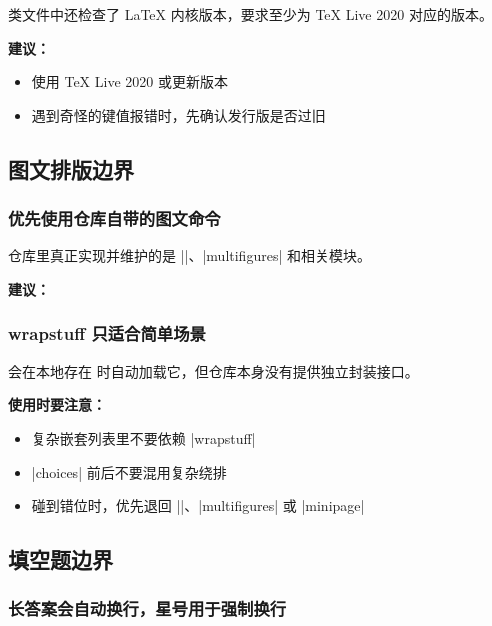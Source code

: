 类文件中还检查了 \LaTeX{} 内核版本，要求至少为 \TeX{} Live 2020 对应的版本。

\textbf{建议：}
\begin{itemize}
  \item 使用 \TeX{} Live 2020 或更新版本
  \item 遇到奇怪的键值报错时，先确认发行版是否过旧
\end{itemize}


\subsection{图文排版边界}

\subsubsection{优先使用仓库自带的图文命令}

仓库里真正实现并维护的是 |\textfigure|、|multifigures| 和相关模块。

\textbf{建议：}

\subsubsection{wrapstuff 只适合简单场景}

 会在本地存在  时自动加载它，但仓库本身没有提供独立封装接口。

\textbf{使用时要注意：}
\begin{itemize}
  \item 复杂嵌套列表里不要依赖 |wrapstuff|
  \item |choices| 前后不要混用复杂绕排
  \item 碰到错位时，优先退回 |\textfigure|、|multifigures| 或 |minipage|
\end{itemize}


\subsection{填空题边界}

\subsubsection{长答案会自动换行，星号用于强制换行}


